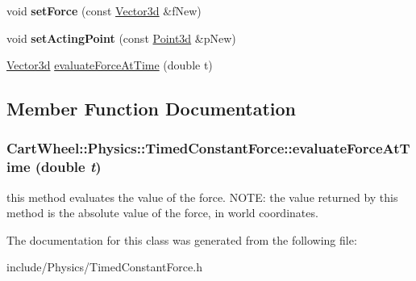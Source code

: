 \begin{DoxyCompactItemize}
\item 
\hypertarget{classCartWheel_1_1Physics_1_1TimedConstantForce_a505fab54a8b09d962117fad501cc9af2}{
void {\bfseries setForce} (const \hyperlink{classCartWheel_1_1Math_1_1Vector3d}{Vector3d} \&fNew)}
\label{classCartWheel_1_1Physics_1_1TimedConstantForce_a505fab54a8b09d962117fad501cc9af2}

\item 
\hypertarget{classCartWheel_1_1Physics_1_1TimedConstantForce_adaeae76333ec37e268919e1817aeeeb9}{
void {\bfseries setActingPoint} (const \hyperlink{classCartWheel_1_1Math_1_1Point3d}{Point3d} \&pNew)}
\label{classCartWheel_1_1Physics_1_1TimedConstantForce_adaeae76333ec37e268919e1817aeeeb9}

\item 
\hyperlink{classCartWheel_1_1Math_1_1Vector3d}{Vector3d} \hyperlink{classCartWheel_1_1Physics_1_1TimedConstantForce_a619d80c474e7905f63b76f3904bddf1e}{evaluateForceAtTime} (double t)
\end{DoxyCompactItemize}


\subsection{Member Function Documentation}
\hypertarget{classCartWheel_1_1Physics_1_1TimedConstantForce_a619d80c474e7905f63b76f3904bddf1e}{
\subsubsection[{evaluateForceAtTime}]{ CartWheel::Physics::TimedConstantForce::evaluateForceAtTime (double {\em t})}}
\label{classCartWheel_1_1Physics_1_1TimedConstantForce_a619d80c474e7905f63b76f3904bddf1e}
this method evaluates the value of the force. NOTE: the value returned by this method is the absolute value of the force, in world coordinates. 

The documentation for this class was generated from the following file:\begin{DoxyCompactItemize}
\item 
include/Physics/TimedConstantForce.h\end{DoxyCompactItemize}
